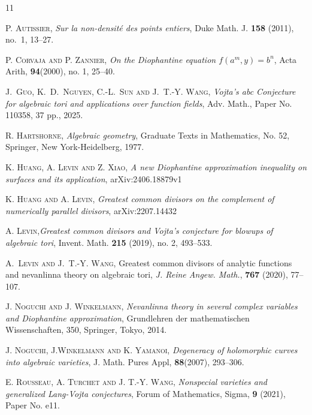 \documentclass[10pt]{amsart}
\numberwithin{equation}{section}
\theoremstyle{plain}
\theoremstyle{definition}
\begin{document}
 
\begin{thebibliography}{11}


\textsc{P. Autissier}, \textit{Sur la non-densit\'e{} des points entiers}, Duke Math. J. {\bf 158} (2011), no.~1, 13--27.

 \textsc{P. Corvaja and P. Zannier,} 
 \emph{On the Diophantine equation $f(a^m,y)=b^n$}, Acta Arith, \textbf{94}(2000), no. 1, 25--40.


  \textsc{J.~Guo, K.~D.~Nguyen, C.-L.~Sun and J.~T.-Y. Wang,} \emph{Vojta's abc Conjecture  for algebraic tori and applications over function fields}, Adv. Math.,  Paper No. 110358, 37 pp., 2025.

\textsc{R. Hartshorne}, \textit{Algebraic geometry}, Graduate Texts in Mathematics, No. 52, Springer, New York-Heidelberg, 1977.

\textsc{K. Huang, A. Levin and Z. Xiao}, \textit{A new Diophantine approximation inequality on surfaces and its application}, arXiv:2406.18879v1

\textsc{K. Huang and A. Levin}, \textit{Greatest common divisors on the complement
of numerically parallel divisors},  arXiv:2207.14432

\textsc{ A. Levin},\textit{Greatest common divisors and Vojta's conjecture for blowups of algebraic
tori}, Invent. Math. {\bf 215} (2019), no. 2, 493--533.

\textsc{ A.~Levin and J.~T.-Y. Wang},
  Greatest common divisors of analytic functions and nevanlinna theory on
  algebraic tori,  \emph{J. Reine Angew. Math.}, \textbf{767}
  (2020), 77--107.




\textsc{J. Noguchi and J. Winkelmann}, \textit{Nevanlinna theory in several complex variables and Diophantine approximation}, Grundlehren der mathematischen Wissenschaften, 350, Springer, Tokyo, 2014.

  \textsc{J. Noguchi, J.Winkelmann and K. Yamanoi,} 
  \emph{Degeneracy of holomorphic curves into algebraic varieties},  J. Math. Pures  Appl, \textbf{88}(2007), 293--306.



\textsc{E. Rousseau, A. Turchet and J. T.-Y. Wang}, \textit{Nonspecial varieties and generalized Lang-Vojta conjectures}, Forum of Mathematics, Sigma, {\bf 9} (2021), Paper No. e11.


\end{thebibliography}
\end{document}
